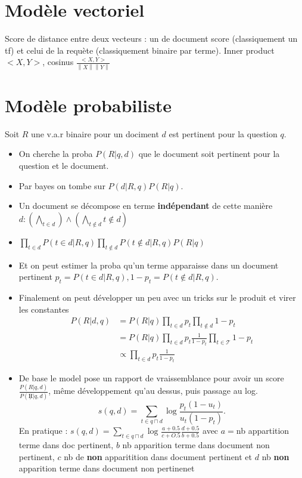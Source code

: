 \documentclass{article}
\begin{document}
\begin{multicols}{2}
\section{Modèle vectoriel}
Score de distance entre deux vecteurs : un de document score (classiquement un tf) et celui de la requète (classiquement binaire par terme). Inner product $ <X,Y> $, cosinus $ \frac{<X,Y>}{\left\| X \right\| \left\| Y \right\| } $ 

\section{Modèle probabiliste}
Soit $ R $ une v.a.r binaire pour un dociment $ d $ est pertinent pour la question $ q $. 
\begin{itemize}
    \item On cherche la proba $ P(R | q,d) $ que le document soit pertinent pour la question et le document.
    \item Par bayes on tombe sur $ P(d | R, q) P(R | q ) $.
    \item Un document se décompose en terme \textbf{indépendant} de cette manière  $d : (\bigwedge_{t \in d} ) \wedge (\bigwedge_{t \not \in d} t \not \in d)$
    \item $ \prod_{t \in d}^{} P(t \in d | R, q) \prod_{t \not\in d} P(t \not \in d | R, q) P( R | q) $
    \item Et on peut estimer la proba qu'un terme apparaisse dans un document pertinent $ p_t = P(t \in d | R, q), 1 - p_t = P(t \not\in d | R, q) $. 
    \item Finalement on peut développer un peu avec un tricks sur le produit et virer les constantes\begin{align*}
        P(R | d,q) &= P(R|q) \prod_{t \in d} p_t \prod_{t \not\in d} 1 - p_t \\
                &= P(R | q) \prod_{t \in d}^{} p_t \frac{1}{1 - p_t} \prod_{t \in \mathcal{T}}^{} 1 - p_t \\ 
                &\propto \prod_{t \in d}^{} p_t \frac{1}{1 - p_t}
    \end{align*}
    \item De base le model pose un rapport de vraissemblance pour avoir un score $ \frac{P(R | q, d)}{P(\not R | q, d)} $, même développement qu'au dessus, puis passage au log. 
    \[
        s(q,d) = \sum_{t \in q \sqcap d}^{} \log \frac{p_t (1 - u_t)}{u_t (1 - p_t)}
    .\]
    En pratique : $ s(q,d) = \sum_{t \in q \sqcap d}^{} \log_{} \frac{a + 0.5}{c + O.5} \frac{d + 0.5}{b+0.5} $ avec $a=$nb appartition terme dans doc pertinent, $b$ nb apparition terme dans document non pertinent, $c$ nb de \textbf{non} apparitition dans document pertinent et $d$ nb \textbf{non} apparition terme dans document non pertinenet

\end{itemize}
\end{multicols}
\end{document}
